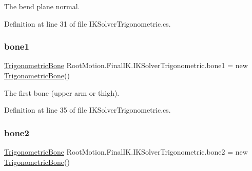 The bend plane normal. 



Definition at line 31 of file I\+K\+Solver\+Trigonometric.\+cs.

\mbox{\label{class_root_motion_1_1_final_i_k_1_1_i_k_solver_trigonometric_a3c29124b8fc59d81406c2ce57da202eb}} 
\subsubsection{\texorpdfstring{bone1}{bone1}}
{\footnotesize\ttfamily \mbox{\hyperlink{class_root_motion_1_1_final_i_k_1_1_i_k_solver_trigonometric_1_1_trigonometric_bone}{Trigonometric\+Bone}} Root\+Motion.\+Final\+I\+K.\+I\+K\+Solver\+Trigonometric.\+bone1 = new \mbox{\hyperlink{class_root_motion_1_1_final_i_k_1_1_i_k_solver_trigonometric_1_1_trigonometric_bone}{Trigonometric\+Bone}}()}



The first bone (upper arm or thigh). 



Definition at line 35 of file I\+K\+Solver\+Trigonometric.\+cs.

\mbox{\label{class_root_motion_1_1_final_i_k_1_1_i_k_solver_trigonometric_a27296f269cce9e3806879ffc67778525}} 
\subsubsection{\texorpdfstring{bone2}{bone2}}
{\footnotesize\ttfamily \mbox{\hyperlink{class_root_motion_1_1_final_i_k_1_1_i_k_solver_trigonometric_1_1_trigonometric_bone}{Trigonometric\+Bone}} Root\+Motion.\+Final\+I\+K.\+I\+K\+Solver\+Trigonometric.\+bone2 = new \mbox{\hyperlink{class_root_motion_1_1_final_i_k_1_1_i_k_solver_trigonometric_1_1_trigonometric_bone}{Trigonometric\+Bone}}()}



